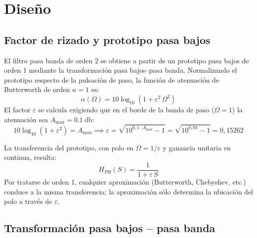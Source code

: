 \section{Diseño}
\label{sec:pbd-diseno}

\subsection{Factor de rizado y prototipo pasa bajos}
\label{subsec:pbd-prototipo}

El filtro pasa banda de orden 2 se obtiene a partir de un prototipo pasa bajos de orden 1 mediante la transformación
pasa bajos--pasa banda. Normalizando el prototipo respecto de la pulsación de paso, la función de atenuación de
Butterworth de orden $n = 1$ es:
\begin{equation}
  \alpha(\Omega) = 10 \log_{10} \left( 1 + \varepsilon^2\,\Omega^2 \right)
  \label{eq:pbd-atenuacion-pb}
\end{equation}
El factor $\varepsilon$ se calcula exigiendo que en el borde de la banda de paso ($\Omega = 1$) la atenuación sea
$A_{\max} = \SI{0.1}{\decibel}$:
\begin{equation}
  10 \log_{10} \left( 1 + \varepsilon^2 \right) = A_{\max} \implies
  \varepsilon = \sqrt{10^{0{,}1 \cdot A_{\max}} - 1} = \sqrt{10^{0{,}01} - 1} = 0{,}15262
  \label{eq:pbd-epsilon}
\end{equation}

La transferencia del prototipo, con polo en $\Omega = 1/\varepsilon$ y ganancia unitaria en continua, resulta:
\begin{equation}
  H_{PB}(S) = \frac{1}{1 + \varepsilon\,S}
  \label{eq:pbd-prototipo}
\end{equation}
Por tratarse de orden 1, cualquier aproximación (Butterworth, Chebyshev, etc.) conduce a la misma transferencia; la
aproximación sólo determina la ubicación del polo a través de $\varepsilon$.

\subsection{Transformación pasa bajos -- pasa banda}
\label{subsec:pbd-transformacion}

